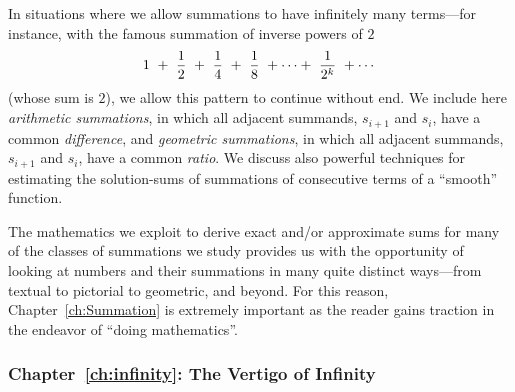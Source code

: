 In situations where we allow summations to have infinitely many terms---for instance, with the famous summation of inverse powers of $2$
\[ 1 \ + \ {1 \over 2} \ + \ {1 \over 4} \ + \ {1 \over 8} \ + \cdots + \ {1 \over {2^k}} \ + \cdots \]
(whose sum is $2$), we allow this pattern to continue without end.  We include here {\it arithmetic summations}, in which all adjacent summands, $s_{i+1}$ and $s_i$, have a common {\em difference}, and {\it geometric summations}, in which all adjacent summands, $s_{i+1}$ and $s_i$, have a common {\em ratio}.  We discuss also powerful techniques for estimating the solution-sums of summations of consecutive terms of a ``smooth'' function.

\smallskip

The mathematics we exploit to derive exact and/or approximate sums for many of the classes of summations we study provides us with the opportunity of looking at numbers and their summations in many quite distinct ways---from textual to pictorial to geometric, and beyond.  For this reason, Chapter~\ref{ch:Summation} is extremely important as the reader gains traction in the endeavor of ``doing mathematics''.

\subsubsection{Chapter~\ref{ch:infinity}: The Vertigo of Infinity}

